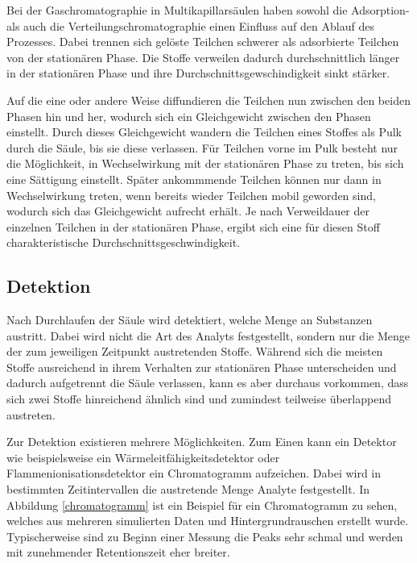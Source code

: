 Bei der Gaschromatographie in Multikapillarsäulen haben sowohl die Adsorption- als auch die Verteilungschromatographie einen Einfluss auf den Ablauf des Prozesses. Dabei trennen sich gelöste Teilchen schwerer als adsorbierte Teilchen von der stationären Phase. Die Stoffe verweilen dadurch durchschnittlich länger in der stationären Phase und ihre Durchschnittsgewschindigkeit sinkt stärker.

Auf die eine oder andere Weise diffundieren die Teilchen nun zwischen den beiden Phasen hin und her, wodurch sich ein Gleichgewicht zwischen den Phasen einstellt. Durch dieses Gleichgewicht wandern die Teilchen eines Stoffes als Pulk durch die Säule, bis sie diese verlassen. Für Teilchen vorne im Pulk besteht nur die Möglichkeit, in Wechselwirkung mit der stationären Phase zu treten, bis sich eine Sättigung einstellt. Später ankommmende Teilchen können nur dann in Wechselwirkung treten, wenn bereits wieder Teilchen mobil geworden sind, wodurch sich das Gleichgewicht aufrecht erhält. 
Je nach Verweildauer der einzelnen Teilchen in der stationären Phase, ergibt sich eine für diesen Stoff charakteristische Durchschnittsgeschwindigkeit.%


\subsection{Detektion}
Nach Durchlaufen der Säule wird detektiert, welche Menge an Substanzen austritt. Dabei wird nicht die Art des Analyts festgestellt, sondern nur die Menge der zum jeweiligen Zeitpunkt austretenden Stoffe. Während sich die meisten Stoffe ausreichend in ihrem Verhalten zur stationären Phase unterscheiden und dadurch aufgetrennt die Säule verlassen, kann es aber durchaus vorkommen, dass sich zwei Stoffe hinreichend ähnlich sind und  zumindest teilweise überlappend austreten.

Zur Detektion existieren mehrere Möglichkeiten. Zum Einen kann ein Detektor wie beispielsweise ein Wärmeleitfähigkeitsdetektor oder Flammenionisationsdetektor ein Chromatogramm aufzeichen. Dabei wird in bestimmten Zeitintervallen die austretende Menge Analyte festgestellt. 
In Abbildung \ref{chromatogramm} ist ein Beispiel für ein Chromatogramm zu sehen, welches aus mehreren simulierten Daten und Hintergrundrauschen erstellt wurde.
Typischerweise sind zu Beginn einer Messung die Peaks sehr schmal und werden mit zunehmender Retentionszeit eher breiter.

